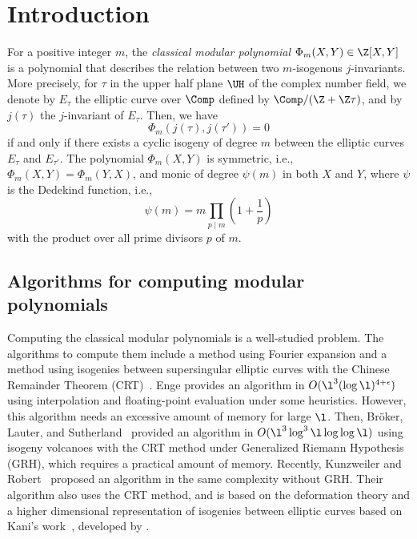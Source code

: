 \documentclass{amsart}
\theoremstyle{definition}
\theoremstyle{remark}
\numberwithin{equation}{section}
\begin{document}
\maketitle

\section{Introduction}
For a positive integer $m$,
the \emph{classical modular polynomial} $\Phi_m(X, Y) \in \Z[X, Y]$
is a polynomial that describes the relation between two $m$-isogenous $j$-invariants.
More precisely,
for $\tau$ in the upper half plane $\UH$ of the complex number field,
we denote by $E_\tau$ the elliptic curve over $\Comp$ defined by
$\Comp / (\Z + \Z\tau)$,
and by $j(\tau)$ the $j$-invariant of $E_\tau$.
Then, we have
\begin{equation*}
    \Phi_m(j(\tau), j(\tau')) = 0
\end{equation*}
if and only if there exists a cyclic isogeny of degree $m$
between the elliptic curves $E_\tau$ and $E_{\tau'}$.
The polynomial $\Phi_m(X, Y)$ is symmetric,
i.e., $\Phi_m(X, Y) = \Phi_m(Y, X)$,
and monic of degree $\psi(m)$ in both $X$ and $Y$,
where $\psi$ is the Dedekind function, i.e.,
\begin{equation*}
    \psi(m) = m \prod_{p \mid m} \left(1 + \frac{1}{p}\right)
\end{equation*}
with the product over all prime divisors $p$ of $m$.

\subsection{Algorithms for computing modular polynomials}
Computing the classical modular polynomials is a well-studied problem.
The algorithms to compute them include
a method using Fourier expansion \cite{Elk97}
and a method using isogenies between supersingular elliptic curves
with the Chinese Remainder Theorem (CRT)~\cite{CL05}.
Enge \cite{Eng09} provides an algorithm in $O(\l^3(\log\l)^{4+\epsilon})$ using interpolation and floating-point evaluation 
under some heuristics.
However, this algorithm needs an excessive amount of memory for large $\l$. 
Then, Br\"{o}ker, Lauter, and Sutherland~\cite{broker2012modular} provided
an algorithm in $O(\l^3\log^3\l\log\log \l)$ using
isogeny volcanoes with the CRT method under Generalized Riemann Hypothesis (GRH),
which requires a practical amount of memory.
Recently, Kunzweiler and Robert~\cite{deformation_Kunzweiler_2024} proposed
an algorithm in the same complexity without GRH.
Their algorithm also uses the CRT method,
and is based on the deformation theory and
a higher dimensional representation of isogenies between elliptic curves
based on Kani's work~\cite{Kan1997number},
developed by \cite{EC:CasDec23,EC:MMPPW23,EC:Robert23}.
\end{document}
